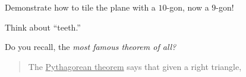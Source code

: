 \documentclass[noauthor,nooutcomes,handout,hints]{ximera}
\begin{document}
\begin{question}
  Demonstrate how to tile the plane with a $10$-gon, now a $9$-gon!

  \begin{hint}
    Think about ``teeth.''
  \end{hint}  
\end{question}
\mynewpage



\begin{question}
  Do you recall, the \textit{most famous theorem of all?}
    \begin{mdframed}[style=OutcomeStyle]\begin{quote}
    The \underline{Pythagorean theorem} says that given a right
    triangle,
    \begin{center}
\end{center}
\end{quote}
\end{mdframed}
\end{question}
\end{document}
